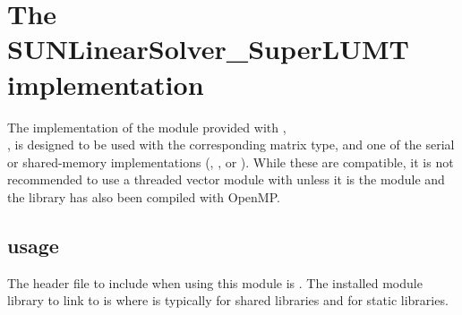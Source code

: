 \section{The SUNLinearSolver\_SuperLUMT implementation}\label{ss:sunlinsol_superlumt}

The {\superlumt} implementation of the {\sunlinsol} module provided with
{\sundials},\\
\noindent{\sunlinsolslumt}, is designed to be used with the
corresponding {\sunmatsparse} matrix type, and one of the serial or
shared-memory {\nvector} implementations ({\nvecs}, {\nvecopenmp}, or 
{\nvecpthreads}).  While these are compatible, it is not recommended
to use a threaded vector module with {\sunlinsolslumt} unless it is
the {\nvecopenmp} module and the {\superlumt} library has also been
compiled with OpenMP.

\subsection{{\sunlinsolslumt} usage}\label{ss:sunlinsol_slumt_usage}

The header file to include when using this module 
is . The installed module
library to link to is
where  is typically  for shared libraries and
 for static libraries.



